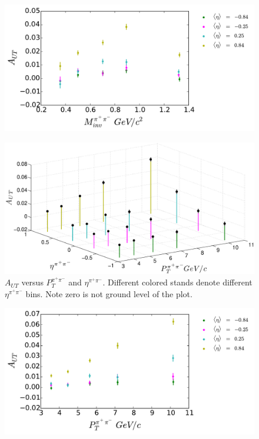\documentclass[abstract = on,listof=totoc, bibliography=totoc]{scrreprt}
\newcommand{\ptpair}{P_{T}^{\pi^+\pi^-}}
\newcommand{\etapair}{\eta^{\pi^+\pi^-}}
\begin{document}
\begin{figure}
\begin{center}
\includegraphics[width = 1\textwidth]{Asym2dProjMassEta82415_v2}
\caption[]{}
\label{fig:2dMassEta}
\end{center}
\end{figure}


\begin{figure}
\begin{center}
\includegraphics[width = 1\textwidth]{ptEta3d82415}
\caption[Asymmetry vs $\etapair$ and $\ptpair$ 2D binning]{$A_{UT}$ versus $\ptpair$ and $\etapair$. Different colored stands denote different $\etapair$ bins. Note zero is not ground level of the plot.}
\label{fig:3dPtEta}
\end{center}
\end{figure}


\begin{figure}
\begin{center}
\includegraphics[width = 1\textwidth]{Asym2dProjPtEta82415_v2}
\caption[]{}
\label{fig:2dPtEta}
\end{center}
\end{figure}
\end{document}
